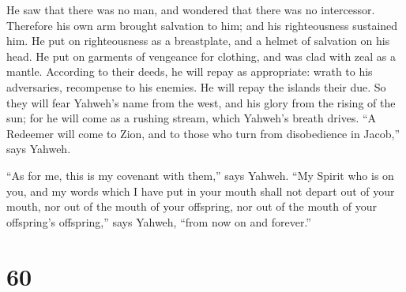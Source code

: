  He saw that there was no man, and wondered that there
was no intercessor. Therefore his own arm brought salvation to him; and
his righteousness sustained him.  He put on righteousness
as a breastplate, and a helmet of salvation on his head. He put on
garments of vengeance for clothing, and was clad with zeal as a mantle.
 According to their deeds, he will repay as appropriate:
wrath to his adversaries, recompense to his enemies. He will repay the
islands their due.  So they will fear Yahweh's name from
the west, and his glory from the rising of the sun; for he will come as
a rushing stream, which Yahweh's breath drives.  ``A
Redeemer will come to Zion, and to those who turn from disobedience in
Jacob,'' says Yahweh.

 ``As for me, this is my covenant with them,'' says
Yahweh. ``My Spirit who is on you, and my words which I have put in your
mouth shall not depart out of your mouth, nor out of the mouth of your
offspring, nor out of the mouth of your offspring's offspring,'' says
Yahweh, ``from now on and forever.''

\hypertarget{section-57}{%
\section{60}\label{section-57}}

